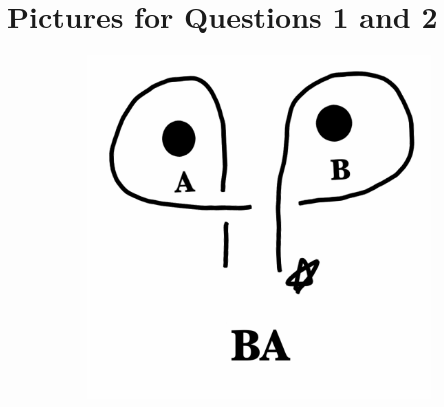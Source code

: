 \documentclass[12pt,letterpaper]{article}
\theoremstyle{definition}
\begin{document}
\setlength{\parskip}{1ex plus 0.5ex minus 0.2ex}
\setlength{\parindent}{0pt}

\pagestyle{fancy}
\cfoot{}


\section*{Pictures for Questions 1 and 2}

\begin{figure}[h!]
    \begin{subfigure}[b]{0.4\textwidth}
        \includegraphics[width=\textwidth]{phppics/BA-label.png}
    \end{subfigure}
    \qquad
    \begin{subfigure}[b]{0.4\textwidth}

\end{subfigure}
\end{figure}
\end{document}
